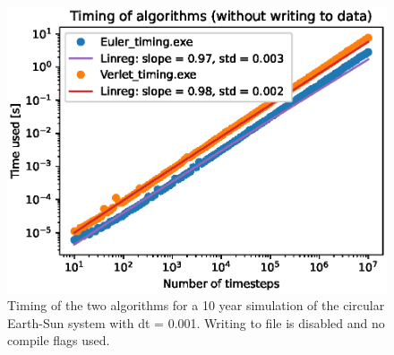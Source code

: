 \documentclass[american,a4paper,12pt]{article}
\begin{document}
\begin{figure}[H]
    \centering
    \includegraphics[width = \textwidth]{figures/EarthSun_timing.eps}
    \caption{Timing of the two algorithms for a 10 year simulation of the circular Earth-Sun system with dt = 0.001. Writing to file is disabled and no compile flags used.}
    \label{fig:ES_timing}
\end{figure}
\end{document}
